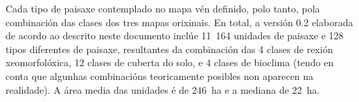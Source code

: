 \documentclass[11pt,a4paper]{article}
\begin{document}
Cada tipo de paisaxe contemplado no mapa vén definido, polo tanto, pola combinación das clases dos tres mapas orixinais. En total, a versión 0.2 elaborada de acordo ao descrito neste documento inclúe 11~164 unidades de paisaxe e 128 tipos diferentes de paisaxe, resultantes da combinación das 4 clases de rexión xeomorfolóxica, 12 clases de cuberta do solo, e 4 clases de bioclima (tendo en conta que algunhas combinacións teoricamente posibles non aparecen na realidade). A área media das unidades é de 246~ha e a mediana de 22~ha.







\clearpage


\end{document}
